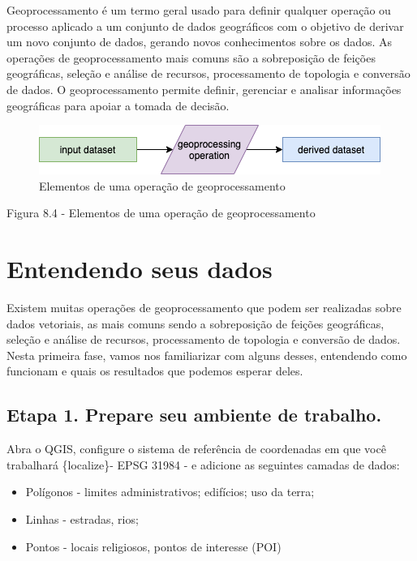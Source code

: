 \documentclass[
  portuguese,
]{krantz}
\providecommand{\tightlist}{%
  \setlength{\itemsep}{0pt}\setlength{\parskip}{0pt}}
\begin{document}
Geoprocessamento é um termo geral usado para definir qualquer operação ou processo aplicado a um conjunto de dados geográficos com o objetivo de derivar um novo conjunto de dados, gerando novos conhecimentos sobre os dados. As operações de geoprocessamento mais comuns são a sobreposição de feições geográficas, seleção e análise de recursos, processamento de topologia e conversão de dados. O geoprocessamento permite definir, gerenciar e analisar informações geográficas para apoiar a tomada de decisão.

\begin{figure}
\centering
\includegraphics{media/modulo8/fig84.png}
\caption{Elementos de uma operação de geoprocessamento}
\end{figure}

Figura 8.4 - Elementos de uma operação de geoprocessamento

\hypertarget{entendendo-seus-dados}{%
\section{Entendendo seus dados}\label{entendendo-seus-dados}}

Existem muitas operações de geoprocessamento que podem ser realizadas sobre dados vetoriais, as mais comuns sendo a sobreposição de feições geográficas, seleção e análise de recursos, processamento de topologia e conversão de dados. Nesta primeira fase, vamos nos familiarizar com alguns desses, entendendo como funcionam e quais os resultados que podemos esperar deles.

\hypertarget{etapa-1.-prepare-seu-ambiente-de-trabalho.}{%
\subsection{\texorpdfstring{\textbf{Etapa 1. Prepare seu ambiente de trabalho.}}{Etapa 1. Prepare seu ambiente de trabalho.}}\label{etapa-1.-prepare-seu-ambiente-de-trabalho.}}

Abra o QGIS, configure o sistema de referência de coordenadas em que você trabalhará \{localize\}- EPSG 31984 - e adicione as seguintes camadas de dados:

\begin{itemize}
\tightlist
\item
  Polígonos - limites administrativos; edifícios; uso da terra;
\item
  Linhas - estradas, rios;
\item
  Pontos - locais religiosos, pontos de interesse (POI)
\end{itemize}
\end{document}
